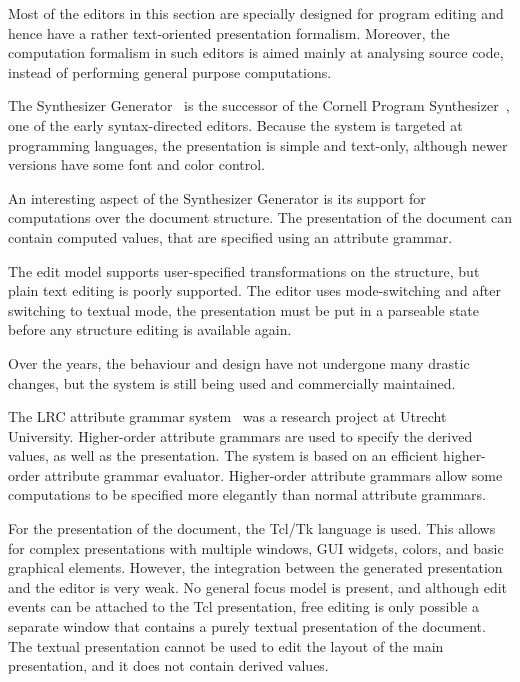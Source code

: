 Most of the editors in this section are specially designed for program editing and hence have a rather text-oriented presentation formalism. Moreover, the computation formalism in such editors is aimed mainly at analysing source code, instead of performing general purpose computations. 


The Synthesizer Generator~\cite{reps84synGen} is the successor of the Cornell Program Synthesizer~\cite{teitelbaum81progSynth}, one of the early syntax-directed editors. Because the system is targeted at programming languages, the presentation is simple and text-only, although newer versions have some font and color control. 


An interesting aspect of the Synthesizer Generator is its support for computations over the document structure. The presentation of the document can contain computed values, that are specified using an attribute grammar. 

The edit model supports user-specified transformations on the structure, but plain text editing is poorly supported. The editor uses mode-switching and after switching to textual mode, the presentation must be put in a parseable state before any structure editing is available again.

Over the years, the behaviour and design have not undergone many drastic changes, but the system is still being used and commercially maintained.


The LRC attribute grammar system~\cite{saraiva00lrc} was a research project at Utrecht University. Higher-order attribute grammars are used to specify the derived values, as well as the presentation. The system is based on an efficient higher-order attribute grammar evaluator. Higher-order attribute grammars allow some computations to be specified more elegantly than normal attribute grammars.

For the presentation of the document, the Tcl/Tk language is used. This allows for complex presentations with multiple windows, GUI widgets, colors, and basic graphical elements. However, the integration between the generated presentation and the editor is very weak. No general focus model is present, and although edit events can be attached to the Tcl presentation, free editing is only possible a separate window that contains a purely textual presentation of the document. The textual presentation cannot be used to edit the layout of the main presentation, and it does not contain derived values. 

